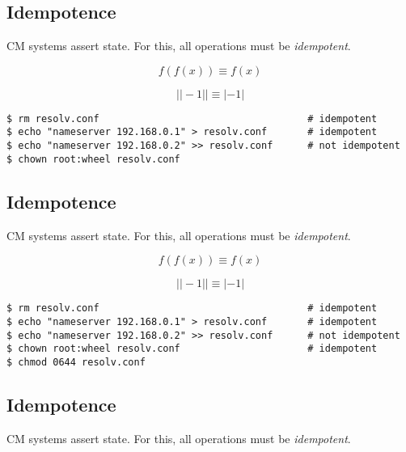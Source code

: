 \documentclass[xga]{xdvislides}
\begin{document}
\subsection{Idempotence}
CM systems assert state.  For this, all operations
must be {\em idempotent}. \\
\vspace{.5in}

\begin{displaymath}
f(f(x)) \equiv f(x)
\end{displaymath}

\begin{displaymath}
| |-1| | \equiv |-1|
\end{displaymath}

\begin{verbatim}
$ rm resolv.conf                                    # idempotent
$ echo "nameserver 192.168.0.1" > resolv.conf       # idempotent
$ echo "nameserver 192.168.0.2" >> resolv.conf      # not idempotent
$ chown root:wheel resolv.conf
\end{verbatim}

\subsection{Idempotence}
CM systems assert state.  For this, all operations
must be {\em idempotent}. \\
\vspace{.5in}

\begin{displaymath}
f(f(x)) \equiv f(x)
\end{displaymath}

\begin{displaymath}
| |-1| | \equiv |-1|
\end{displaymath}

\begin{verbatim}
$ rm resolv.conf                                    # idempotent
$ echo "nameserver 192.168.0.1" > resolv.conf       # idempotent
$ echo "nameserver 192.168.0.2" >> resolv.conf      # not idempotent
$ chown root:wheel resolv.conf                      # idempotent
$ chmod 0644 resolv.conf
\end{verbatim}

\subsection{Idempotence}
CM systems assert state.  For this, all operations
must be {\em idempotent}. \\
\vspace{.5in}
\end{document}
